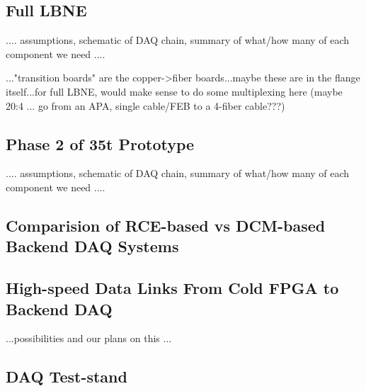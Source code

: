 \subsection{Full LBNE}

....  assumptions, schematic of DAQ chain, summary of what/how many of each component we need  ....  


..."transition boards" are the copper->fiber boards...maybe these are in the flange itself...for full LBNE, would make sense to do some multiplexing here (maybe 20:4 ... go from an APA, single cable/FEB to a 4-fiber cable???)


\subsection{Phase 2 of 35t Prototype}


....  assumptions, schematic of DAQ chain, summary of what/how many of each component we need  ....  


\subsection{Comparision of RCE-based vs DCM-based Backend DAQ Systems}



\subsection{High-speed Data Links From Cold FPGA to Backend DAQ}

...possibilities and our plans on this ...


\subsection{DAQ Test-stand}


